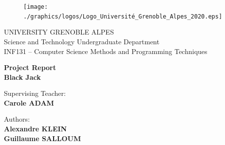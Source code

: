 \documentclass[a4paper, twoside]{report}
\begin{document}





\begin{titlepage}
\begin{figure}[!htb]
    \centering
    \texttt{[image: ./graphics/logos/Logo\_Université\_Grenoble\_Alpes\_2020.eps]}
\end{figure}

\begin{center}
    \LARGE{UNIVERSITY GRENOBLE ALPES}
    \vspace{5mm}
    \\ \large{Science and Technology Undergraduate Department}
    \vspace{5mm}
    \\ \LARGE{INF131 -- Computer Science Methods and Programming Techniques}
\end{center}

\vspace{15mm}
\begin{center}
    {\LARGE{\bf Project Report\\\vspace{5mm}Black Jack}}
\end{center}
\vspace{30mm}

\begin{minipage}[t]{0.47\textwidth}
	{\large{Supervising Teacher:}{\normalsize\vspace{3mm}
	\bf\\ \large{Carole ADAM \vspace{2mm}\\ }}}
\end{minipage}
\hfill
\begin{minipage}[t]{0.47\textwidth}\raggedleft
	{\large{Authors:}{\normalsize\vspace{3mm}
    \bf\\ \large{Alexandre KLEIN \vspace{2mm}\\Guillaume SALLOUM }}}
\end{minipage}

\vspace{30mm}
\hrulefill
\\

\end{titlepage}


{ \hypersetup{hidelinks} \tableofcontents {} }
\end{document}
